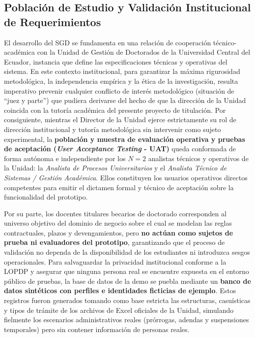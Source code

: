 \subsection{Población de Estudio y Validación Institucional de Requerimientos}

El desarrollo del SGD se fundamenta en una relación de cooperación técnico-académica con la Unidad de Gestión de Doctorados de la Universidad Central del Ecuador, instancia que define las especificaciones técnicas y operativas del sistema. En este contexto institucional, para garantizar la máxima rigurosidad metodológica, la independencia empírica y la ética de la investigación, resulta imperativo prevenir cualquier conflicto de interés metodológico (situación de ``juez y parte'') que pudiera derivarse del hecho de que la dirección de la Unidad coincida con la tutoría académica del presente proyecto de titulación. Por consiguiente, mientras el Director de la Unidad ejerce estrictamente su rol de dirección institucional y tutoría metodológica sin intervenir como sujeto experimental, la \textbf{población y muestra de evaluación operativa y pruebas de aceptación (\textit{User Acceptance Testing} - UAT)} queda conformada de forma autónoma e independiente por los $N = 2$ analistas técnicos y operativos de la Unidad: la \textit{Analista de Procesos Universitarios} y el \textit{Analista Técnico de Sistemas / Gestión Académica}. Ellos constituyen los usuarios operativos directos competentes para emitir el dictamen formal y técnico de aceptación sobre la funcionalidad del prototipo.

Por su parte, los docentes titulares becarios de doctorado corresponden al universo objetivo del dominio de negocio sobre el cual se modelan las reglas contractuales, plazos y devengamientos, pero \textbf{no actúan como sujetos de prueba ni evaluadores del prototipo}, garantizando que el proceso de validación no dependa de la disponibilidad de los estudiantes ni introduzca sesgos operacionales. Para salvaguardar la privacidad institucional conforme a la LOPDP y asegurar que ninguna persona real se encuentre expuesta en el entorno público de pruebas, la base de datos de la demo se puebla mediante un \textbf{banco de datos sintéticos con perfiles e identidades ficticias de ejemplo}. Estos registros fueron generados tomando como base estricta las estructuras, casuísticas y tipos de trámite de los archivos de Excel oficiales de la Unidad, simulando fielmente los escenarios administrativos reales (prórrogas, adendas y suspensiones temporales) pero sin contener información de personas reales.

